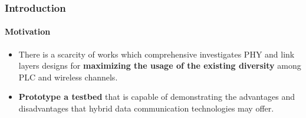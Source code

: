 \documentclass[mathserif]{beamer}
\newcommand{\wait}{\vfill}
\begin{document}
\begin{frame}
	\frametitle{Introduction}
	\framesubtitle{Motivation}
	\begin{itemize}
		\item There is a scarcity of works which comprehensive investigates PHY and link layers designs for \textbf{maximizing the usage of the existing diversity} among PLC and wireless channels. \wait \vfill
		\item \textbf{Prototype a testbed} that is capable of demonstrating the advantages and disadvantages that hybrid data communication technologies may offer. \wait
	\end{itemize}
\end{frame}
	
\end{document}

